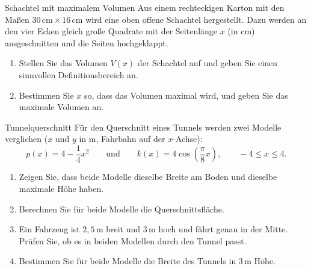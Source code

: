 \begin{uebung}{Schachtel mit maximalem Volumen}
Aus einem rechteckigen Karton mit den Maßen $30\,\text{cm}\times 16\,\text{cm}$ wird eine oben offene Schachtel hergestellt. Dazu werden an den vier Ecken gleich große Quadrate mit der Seitenlänge $x$ (in cm) ausgeschnitten und die Seiten hochgeklappt.
\begin{enumerate}[label=\alph*)]
  \item Stellen Sie das Volumen $V(x)$ der Schachtel auf und geben Sie einen sinnvollen Definitionsbereich an.
  \item Bestimmen Sie $x$ so, dass das Volumen maximal wird, und geben Sie das maximale Volumen an.
\end{enumerate}
\end{uebung}

\begin{uebung}{Tunnelquerschnitt}
Für den Querschnitt eines Tunnels werden zwei Modelle verglichen ($x$ und $y$ in m, Fahrbahn auf der $x$-Achse):
\[p(x) = 4-\dfrac{1}{4}x^2\qquad\text{und}\qquad k(x) = 4\cos{\left(\dfrac{\pi}{8}x\right)},\qquad -4\leq x\leq 4.\]
\begin{enumerate}[label=\alph*)]
  \item Zeigen Sie, dass beide Modelle dieselbe Breite am Boden und dieselbe maximale Höhe haben.
  \item Berechnen Sie für beide Modelle die Querschnittsfläche.
  \item Ein Fahrzeug ist $2{,}5\,\text{m}$ breit und $3\,\text{m}$ hoch und fährt genau in der Mitte. Prüfen Sie, ob es in beiden Modellen durch den Tunnel passt.
  \item Bestimmen Sie für beide Modelle die Breite des Tunnels in $3\,\text{m}$ Höhe.
\end{enumerate}
\end{uebung}

\UebungskapitelEnde
